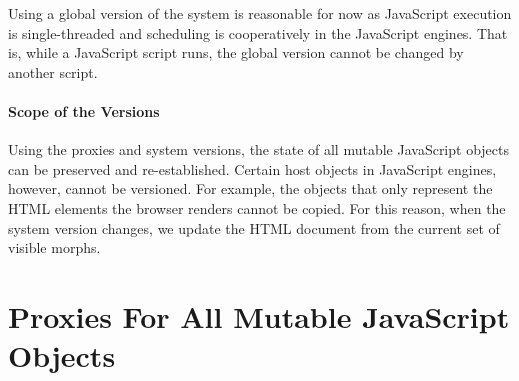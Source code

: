 Using a global version of the system is reasonable for now as JavaScript execution is single-threaded and scheduling is cooperatively in the JavaScript engines.
That is, while a JavaScript script runs, the global version cannot be changed by another script.



\paragraph{Scope of the Versions}
Using the proxies and system versions, the state of all mutable JavaScript objects can be preserved and re-established.
Certain host objects in JavaScript engines, however, cannot be versioned.
For example, the objects that only represent the HTML elements the browser renders cannot be copied.
For this reason, when the system version changes, we update the HTML document from the current set of visible morphs.



\section{Proxies For All Mutable JavaScript Objects}


